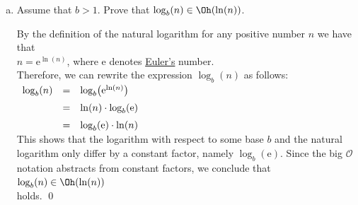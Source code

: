 \exercise
\begin{enumerate}[(a)]
\item Assume that $b > 1$.  Prove that $\log_{b}(n) \in \Oh(\ln(n))$.

      \solution
      By the definition of the natural logarithm for any positive number $n$ we have that
      \\[0.2cm]
      \hspace*{1.3cm}
      $n = \mathrm{e}^{\ln(n)}$, \quad where
      \href{http://en.wikipedia.org/wiki/E_(mathematical_constant)}{$\mathrm{e}$} denotes
      \href{https://en.wikipedia.org/wiki/Leonhard_Euler}{Euler's} number. 
      \\[0.2cm]
      Therefore, we can rewrite the expression $\log_b(n)$
      as follows:
      \\[0.2cm]
      \hspace*{1.3cm}
      $
      \begin{array}[t]{lcl}
        \log_b(n) & = & \log_b\bigl(\mathrm{e}^{\ln(n)}\bigr) \\[0.2cm]
                  & = & \ln(n) \cdot \log_b(\mathrm{e})      \\[0.2cm]
                  & = & \log_b(\mathrm{e}) \cdot \ln(n)
      \end{array}
      $
      \\[0.2cm]
      This shows that the logarithm with respect to some base $b$ and the natural logarithm 
      only differ by a constant factor, namely $\log_b(\mathrm{e})$.  Since the big $\mathcal{O}$ notation abstracts from
      constant factors, we conclude that
      \\[0.2cm]
      \hspace*{1.3cm}
      $\log_{b}(n) \in \Oh(\ln(n))$
      \\[0.2cm]
      holds. \qed


\end{enumerate}
